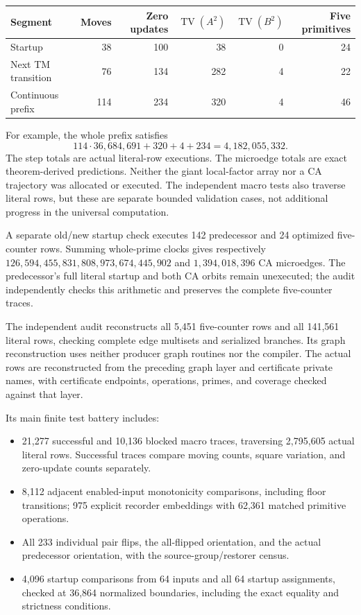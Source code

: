 \documentclass[11pt,a4paper]{article}
\numberwithin{equation}{section}
\newcommand{\TV}{\operatorname{TV}}
\begin{document}
\begin{center}\small
\begin{tabular}{@{}lrrrrr@{}}
\toprule
Segment & Moves & Zero updates & $\TV(A^2)$ & $\TV(B^2)$ & Five primitives\\
\midrule
Startup & 38 & 100 & 38 & 0 & 24\\
Next TM transition & 76 & 134 & 282 & 4 & 22\\
Continuous prefix & 114 & 234 & 320 & 4 & 46\\
\bottomrule
\end{tabular}
\end{center}

For example, the whole prefix satisfies
\[
 114\cdot36{,}684{,}691+320+4+234=4{,}182{,}055{,}332.
\]
The step totals are actual literal-row executions. The microedge totals
are exact theorem-derived predictions. Neither the giant local-factor
array nor a CA trajectory was allocated or executed. The independent
macro tests also traverse literal rows, but these are separate bounded
validation cases, not additional progress in the universal computation.

A separate old/new startup check executes 142 predecessor and 24 optimized
five-counter rows. Summing whole-prime clocks gives respectively
$126{,}594{,}455{,}831{,}808{,}973{,}674{,}445{,}902$ and
$1{,}394{,}018{,}396$ CA microedges. The predecessor's full literal startup
and both CA orbits remain unexecuted; the audit independently checks this
arithmetic and preserves the complete five-counter traces.

The independent audit reconstructs all 5,451 five-counter rows and all
141,561 literal rows, checking complete edge multisets and serialized
branches. Its graph reconstruction uses neither producer graph routines nor the compiler.
The actual rows are reconstructed from the preceding graph layer and
certificate private names, with certificate endpoints, operations, primes,
and coverage checked against that layer.

Its main finite test battery includes:
\begin{itemize}
\item 21,277 successful and 10,136 blocked macro traces, traversing
2,795,605 actual literal rows. Successful traces compare moving counts,
square variation, and zero-update counts separately.
\item 8,112 adjacent enabled-input monotonicity comparisons, including
floor transitions; 975 explicit recorder embeddings with 62,361 matched
primitive operations.
\item All 233 individual pair flips, the all-flipped orientation, and the
actual predecessor orientation, with the source-group/restorer census.
\item 4,096 startup comparisons from 64 inputs and all 64 startup
assignments, checked at 36,864 normalized boundaries, including the exact
equality and strictness conditions.
\end{itemize}
\end{document}

